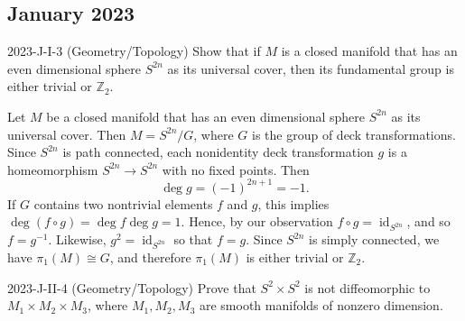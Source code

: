 \documentclass{article}
\begin{document}
\subsection{January 2023}
\begin{prb}{2023-J-I-3 (Geometry/Topology)}
	Show that if $M$ is a closed manifold that has an even dimensional sphere $S^{2n}$ as its universal cover, then its fundamental group is either trivial or $\mathbb{Z}_{2}$. 
\end{prb}
\begin{solutions}
	Let $M$ be a closed manifold that has an even dimensional sphere $S^{2n}$ as its universal cover. Then $M = S^{2n}/G$, where $G$ is the group of deck transformations. Since $S^{2n}$ is path connected, each nonidentity deck transformation $g$ is a homeomorphism $S^{2n} \to S^{2n}$ with no fixed points. Then 
		\begin{equation}
			\deg{g} = (-1)^{2n + 1} =-1. 
		\end{equation}
	If $G$ contains two nontrivial elements $f$ and $g$, this implies $\deg(f \circ g) = \deg{f}\deg{g}= 1$. Hence, by our observation $f \circ g = \operatorname{id}_{S^{2n}}$, and so $f = g^{-1}$. Likewise, $g^{2} = \operatorname{id}_{S^{2n}}$ so that $f = g$. Since $S^{2n}$ is simply connected, we have $\pi_{1}(M) \cong G$, and therefore $\pi_{1}(M)$ is either trivial or $\mathbb{Z}_{2}$. 
\end{solutions}
\begin{prb}{2023-J-II-4 (Geometry/Topology)}
	Prove that $S^{2} \times S^{2}$ is not diffeomorphic to $M_{1} \times M_{2} \times M_{3}$, where $M_{1}, M_{2}, M_{3}$ are smooth manifolds of nonzero dimension. 
\end{prb}
\end{document}
